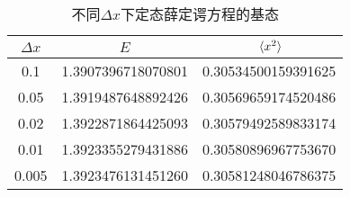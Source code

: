 
\begin{table}
    \caption{不同$\Delta x$下定态薛定谔方程的基态}
    \label{tbl:stationary-benchmark}
    \centering
    \begin{tabular}{ccc}
        \toprule
          $\Delta x$ & $E$ & $\expval*{x^2}$ \\
        \midrule
          0.1   & 1.3907396718070801  & 0.30534500159391625  \\
          0.05  & 1.3919487648892426  & 0.30569659174520486  \\
          0.02  & 1.3922871864425093  & 0.30579492589833174  \\
          0.01  & 1.3923355279431886  & 0.30580896967753670 \\ 
          0.005 & 1.3923476131451260  & 0.30581248046786375  \\
        \bottomrule
    \end{tabular}
\end{table}
